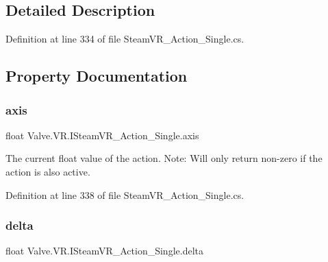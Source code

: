 \subsection{Detailed Description}


Definition at line 334 of file Steam\+V\+R\+\_\+\+Action\+\_\+\+Single.\+cs.



\subsection{Property Documentation}
\mbox{\label{interface_valve_1_1_v_r_1_1_i_steam_v_r___action___single_a51e2b958e7e678850dbe748478029091}} 
\subsubsection{\texorpdfstring{axis}{axis}}
{\footnotesize\ttfamily float Valve.\+V\+R.\+I\+Steam\+V\+R\+\_\+\+Action\+\_\+\+Single.\+axis\hspace{0.3cm}{\ttfamily [get]}}



The current float value of the action. Note\+: Will only return non-\/zero if the action is also active. 



Definition at line 338 of file Steam\+V\+R\+\_\+\+Action\+\_\+\+Single.\+cs.

\mbox{\label{interface_valve_1_1_v_r_1_1_i_steam_v_r___action___single_a105b3532179c7545252c39e0485cacbb}} 
\subsubsection{\texorpdfstring{delta}{delta}}
{\footnotesize\ttfamily float Valve.\+V\+R.\+I\+Steam\+V\+R\+\_\+\+Action\+\_\+\+Single.\+delta\hspace{0.3cm}{\ttfamily [get]}}



